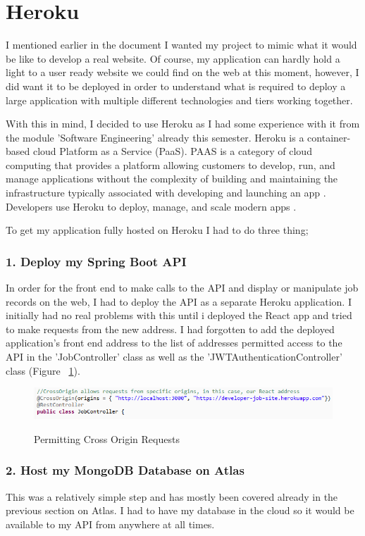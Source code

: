 \section{Heroku}
I mentioned earlier in the document I wanted my project to mimic what it would be like to develop a real website. Of course, my application can hardly hold a light to a user ready website we could find on the web at this moment, however, I did want it to be deployed in order to understand what is required to deploy a large application with multiple different technologies and tiers working together.

With this in mind, I decided to use Heroku as I had some experience with it from the module 'Software Engineering' already this semester.
Heroku is a container-based cloud Platform as a Service (PaaS). PAAS is a category of cloud computing that provides a platform allowing customers to develop, run, and manage applications without the complexity of building and maintaining the infrastructure typically associated with developing and launching an app \cite{wiki:paas}. Developers use Heroku to deploy, manage, and scale modern apps \cite{Heroku:about}.

To get my application fully hosted on Heroku I had to do three thing;
\subsubsection{1. Deploy my Spring Boot API}
In order for the front end to make calls to the API and display or manipulate job records on the web, I had to deploy the API as a separate Heroku application. I initially had no real problems with this until i deployed the React app and tried to make requests from the new address. I had forgotten to add the deployed application's front end address to the list of addresses permitted access to the API in the 'JobController' class as well as the 'JWTAuthenticationController' class (Figure ~\ref{heroku1_label}).

\begin{figure}[ht]
    \centering
    \includegraphics[scale=0.62]{Images/heroku1.png} 
    \label{heroku1_label}
    \caption{Permitting Cross Origin Requests}
\end{figure}

\subsubsection{2. Host my MongoDB Database on Atlas}
This was a relatively simple step and has mostly been covered already in the previous section on Atlas. I had to have my database in the cloud so it would be available to my API from anywhere at all times.
